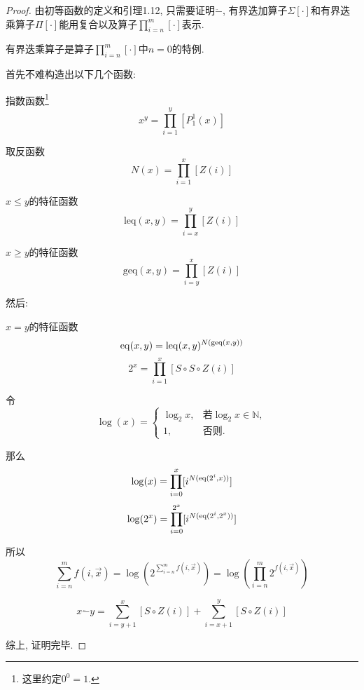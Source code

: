 \begin{proof}
    由初等函数的定义和引理1.12, 只需要证明$\ddot{-}$, 有界迭加算子$\Sigma[\cdot]$和有界迭乘算子$\Pi[\cdot]$能用复合以及算子$\displaystyle\prod_{i=n}^m[\cdot]$表示.

    有界迭乘算子是算子$\displaystyle\prod_{i=n}^m[\cdot]$中$n=0$的特例.

    首先不难构造出以下几个函数:

    指数函数\footnote{这里约定$0^0=1$.}$$x^y=\prod_{i=1}^y[P_1^1(x)]$$
	
    取反函数$$N(x)=\prod_{i=1}^x[Z(i)]$$
	
    $x\leqslant y$的特征函数$$\mathrm{leq}(x,y)=\prod_{i=x}^y[Z(i)]$$
	
    $x\geqslant y$的特征函数$$\mathrm{geq}(x,y)=\prod_{i=y}^x[Z(i)]$$

    然后:

    $x=y$的特征函数$$\mathrm{eq}(x,y)=\mathrm{leq}(x,y)^{N(\mathrm{geq}(x,y))}$$
    $$2^x=\prod_{i=1}^x[S\circ S\circ Z(i)]$$
    
    令$$\log(x)=\begin{cases}
        \log_2x,&\textrm{若}\log_2x\in\mathbb{N},\\
        1,&\textrm{否则.}
    \end{cases}$$
	
    那么
    $$\log(x)=\prod_{i=0}^x[i^{N(\mathrm{eq}(2^i,x))}]$$
    $$\log(2^x)=\prod_{i=0}^{2^x}[i^{N(\mathrm{eq}(2^i,2^x))}]$$

    所以
    $$\sum_{i=n}^m f(i,\vec{x})=\log(2^{\sum_{i=n}^m f(i,\vec{x})})=\log(\prod_{i=n}^m 2^{f(i,\vec{x})})$$

    $$x\ddot{-}y=\sum_{i=y+1}^x[S\circ Z(i)] + \sum_{i=x+1}^y[S\circ Z(i)]$$

    综上, 证明完毕.
\end{proof}